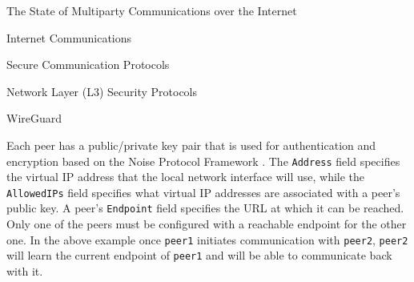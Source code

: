 \begin{frame}[fragile]{The State of Multiparty Communications over the
Internet}
\begin{block}{Internet Communications}
\begin{block}{Secure Communication Protocols}
\begin{block}{Network Layer (L3) Security Protocols}
\begin{block}{WireGuard}
\begin{Shaded}
\begin{Highlighting}[]
\KeywordTok{[Peer]}
\OtherTok{=}
\OtherTok{=}
\OtherTok{=}
\end{Highlighting}
\end{Shaded}

\begin{Shaded}
\begin{Highlighting}[]
\KeywordTok{[Interface]}
\OtherTok{=}
\OtherTok{=}\StringTok{ }
\OtherTok{=}

\KeywordTok{[Peer]}
\OtherTok{=}
\OtherTok{=}
\end{Highlighting}
\end{Shaded}

Each peer has a public/private key pair that is used for authentication
and encryption based on the Noise Protocol Framework
\autocite{noiseDocs}. The \texttt{Address} field specifies the virtual
IP address that the local network interface will use, while the
\texttt{AllowedIPs} field specifies what virtual IP addresses are
associated with a peer's public key. A peer's \texttt{Endpoint} field
specifies the URL at which it can be reached. Only one of the peers must
be configured with a reachable endpoint for the other one. In the above
example once \texttt{peer1} initiates communication with \texttt{peer2},
\texttt{peer2} will learn the current endpoint of \texttt{peer1} and
will be able to communicate back with it.

\end{block}
\end{block}
\end{block}


\end{block}
\end{frame}
